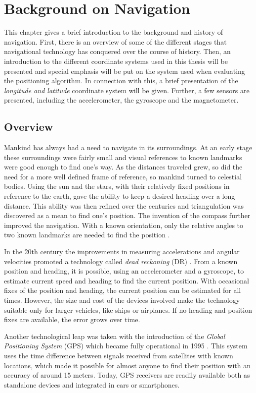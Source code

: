 \documentclass{LTHthesis}
\begin{document}
\chapter{Background on Navigation}
\label{chap:background}
%
This chapter gives a brief introduction to the background and history of navigation. First, there is an overview of some of the different stages that navigational technology has conquered over the course of history. Then, an introduction to the different coordinate systems used in this thesis will be presented and special emphasis will be put on the system used when evaluating the positioning algorithm. In connection with this, a brief presentation of the \emph{longitude and latitude} coordinate system will be given. Further, a few sensors are presented, including the accelerometer, the gyroscope and the magnetometer.
%
\section{Overview}
%
Mankind has always had a need to navigate in its surroundings. At an early stage these surroundings were fairly small and visual references to known landmarks were good enough to find one's way. As the distances traveled grew, so did the need for a more well defined frame of reference, so mankind turned to celestial bodies. Using the sun and the stars, with their relatively fixed positions in reference to the earth, gave the ability to keep a desired heading over a long distance. This ability was then refined over the centuries and triangulation was discovered as a mean to find one's position. The invention of the compass further improved the navigation. With a known orientation, only the relative angles to two known landmarks are needed to find the position \cite{nav}. 

In the 20th century the improvements in measuring accelerations and angular velocities promoted a technology called \emph{dead reckoning} (DR) \cite{gson12,fig_fra10}. From a known position and heading, it is possible, using an accelerometer and a gyroscope, to estimate current speed and heading to find the current position. With occasional fixes of the position and heading, the current position can be estimated for all times. However, the size and cost of the devices involved make the technology suitable only for larger vehicles, like ships or airplanes. If no heading and position fixes are available, the error grows over time.

Another technological leap was taken with the introduction of the \emph{Global Positioning System} (GPS) which became fully operational in 1995 \cite{gps}. This system uses the time difference between signals received from satellites with known locations, which made it possible for almost anyone to find their position with an accuracy of around 15 meters. Today, GPS receivers are readily available both as standalone devices and integrated in cars or smartphones.
\end{document}
